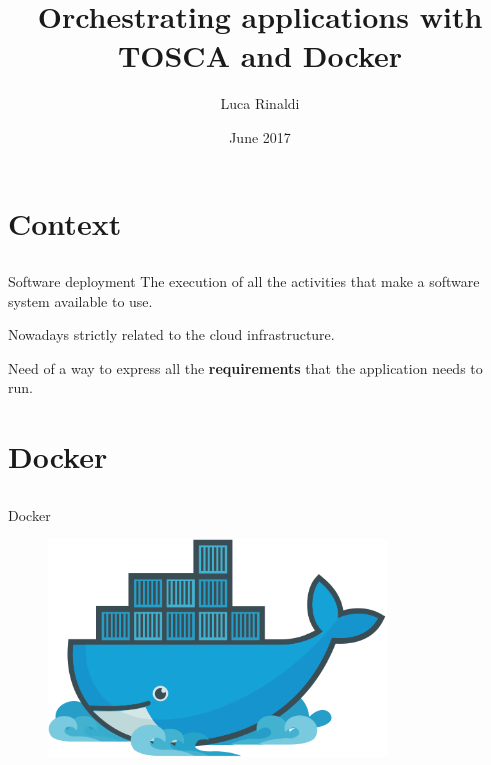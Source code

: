 \documentclass{beamer}
\title[About Beamer] %
{Orchestrating applications with\\ TOSCA and Docker}
\author[lucarin91] %
{Luca Rinaldi}
\institute[unipi] %
{
  {\small University of Pisa}
}
\date[2017] %
{
  {\small June 2017}
}
\begin{document}
\begin{frame}
  \maketitle
\end{frame}


\section{Context}\subsection*{}

  \begin{frame}{Software deployment}
    The execution of all the activities that make a software system available to use.

    Nowadays strictly related to the cloud infrastructure.

    Need of a way to express all the \textbf{requirements} that the application needs to run.
  \end{frame}


\section{Docker}\subsection*{}

  \begin{frame}{Docker}
	\begin{figure}
		\includegraphics[width=0.8\textwidth]{img/docker.png}
       \end{figure}
  \end{frame}
\end{document}
